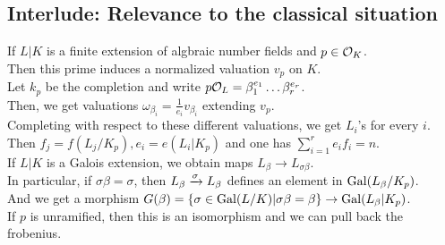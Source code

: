 \documentclass[../main.tex]{subfiles}
\begin{document}
\subsection*{Interlude: Relevance to the classical situation}
If $L|K$ is a finite extension of algbraic number fields and $p \in \mathcal{O}_K$.\\
Then this prime induces a normalized valuation $v_p$ on $K$.\\
Let $k_p$ be the completion and write $p\mathcal{O}_L= \beta_1^{e_1}\ldots \beta_r ^{e_r}$.\\
Then, we get valuations $\omega_{\beta_i} = \frac{1}{e_i}v_{\beta_i} $ extending $v_p$.\\
Completing with respect to these different valuations, we get $L_i$'s for every $i$.\\
Then $f_j = f( L_j/K_p), e_i = e( L_i |K_p) $ and one has $ \sum_{i=1}^{ r}e_i f_i = n$.\\

If $L |K$ is a Galois extension, we obtain maps $L_\beta\to L_{\sigma\beta} $.\\
In particular, if $\sigma \beta= \sigma$, then $L_\beta\xrightarrow{\sigma} L_\beta$ defines an element in $\operatorname{Gal}( L_\beta /K_p) $.\\
And we get a morphism $G( \beta) = \left\{ \sigma \in \operatorname{Gal}( L/K) | \sigma\beta= \beta \right\} \to \operatorname{Gal}( L_\beta|K_p) $.\\
If $p$ is unramified, then this is an isomorphism  and we can pull back the frobenius.
\end{document}
